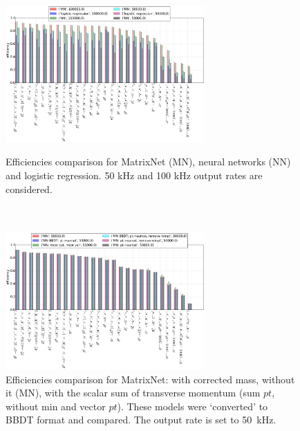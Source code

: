 \documentclass[a4paper]{jpconf}
\begin{document}
\begin{figure}[h]
\begin{minipage}{18pc}
\includegraphics[width=18pc]{../images/track.pdf}
\caption{\label{hlt1_res} Efficiencies comparison for MatrixNet (MN), neural networks (NN) and logistic regression. 50 kHz and 100 kHz output rates are considered. \\ \\ \\ }
\end{minipage}\hspace{2pc}%
\begin{minipage}{18pc}
\includegraphics[width=18pc]{../images/hlt1-2body.pdf}
\caption{\label{hlt12_res} Efficiencies comparison for MatrixNet: with corrected mass, without it (MN), with the scalar sum of transverse momentum (sum $pt$, without min and vector $pt$). These models were `converted' to BBDT format and compared. The output rate is set to 50~kHz.}
\end{minipage} 
\end{figure}
\end{document}
